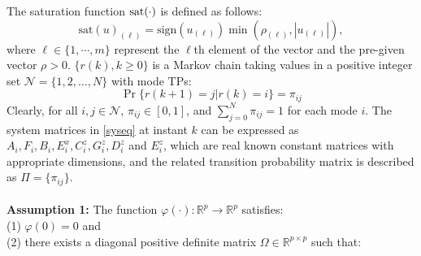 \documentclass[conference]{IEEEtran}
\begin{document}
The saturation function $\rm{sat}(\cdot)$ is defined as follows:
\begin{equation}
\mathrm{sat}(u)_{(\ell)}=\mathrm{sign}(u_{(\ell)}) \min(\rho_{(\ell)},|u_{(\ell)}|),
\end{equation}
where $\ell \in \{1,\cdots,m\}$ represent the $\ell$th element of the vector and  the pre-given vector $\rho>0$. $\{r(k),k\geq0\}$ is a Markov chain taking values in a positive integer set $\mathcal{N}=\{1,2,\dots,N\}$ with mode TPs:
\begin{equation}
	\Pr\{r(k+1)=j|r(k)=i\}=\pi_{ij}
\end{equation}
Clearly, for all $i,j\in\mathcal{N}$, $\pi_{ij}\in[0,1]$, and $\sum_{j=0}^{N}\pi_{ij}=1$ for each mode $i$. The system matrices in \eqref{syseq} at instant $k$ can be expressed as $A_i,F_i,B_i,E^x_i,C^z_i,G^z_i,D^z_i$ and $E^z_i$, which are real known constant matrices with appropriate dimensions, and the related transition probability matrix is described as $\mathit{\Pi}=\{\pi_{ij}\}$.\\
\\
\textbf{Assumption 1:} The function $\varphi(\cdot): \mathbb{R}^{p}\rightarrow\mathbb{R}^{p}$ satisfies:\\ 
(1) $\varphi(0)=0$ and \\
(2) there exists a diagonal positive definite matrix $\varOmega \in\mathbb{R}^{p\times p}$ such that: 
\end{document}
